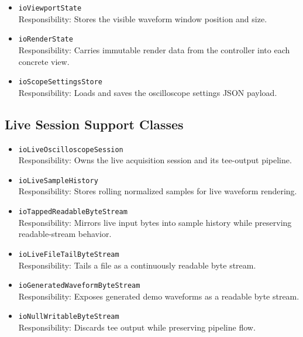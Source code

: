 \begin{itemize}
        \item \texttt{ioViewportState} \\
        Responsibility: Stores the visible waveform window position and size.

        \item \texttt{ioRenderState} \\
        Responsibility: Carries immutable render data from the controller into each concrete view.

        \item \texttt{ioScopeSettingsStore} \\
        Responsibility: Loads and saves the oscilloscope settings JSON payload.
    \end{itemize}

    \subsection{Live Session Support Classes}
    \begin{itemize}
        \item \texttt{ioLiveOscilloscopeSession} \\
        Responsibility: Owns the live acquisition session and its tee-output pipeline.

        \item \texttt{ioLiveSampleHistory} \\
        Responsibility: Stores rolling normalized samples for live waveform rendering.

        \item \texttt{ioTappedReadableByteStream} \\
        Responsibility: Mirrors live input bytes into sample history while preserving readable-stream behavior.

        \item \texttt{ioLiveFileTailByteStream} \\
        Responsibility: Tails a file as a continuously readable byte stream.

        \item \texttt{ioGeneratedWaveformByteStream} \\
        Responsibility: Exposes generated demo waveforms as a readable byte stream.

        \item \texttt{ioNullWritableByteStream} \\
        Responsibility: Discards tee output while preserving pipeline flow.
    \end{itemize}

